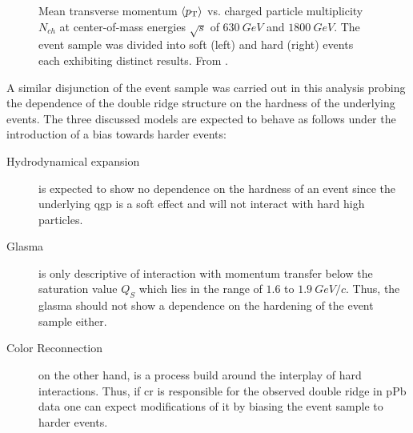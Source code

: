 \begin{figure}
\begin{subfigure}[b]{0.45\textwidth}
  \end{subfigure}
  \caption[Mean transverse momentum $\left< \pt \right>$ vs. charged particle multiplicity $N_{ch}$ at center-of-mass energies $\sqrt{s}$ of $\SI{630}{GeV}$ and $\SI{1800}{GeV}$.]{Mean transverse momentum $\left< \pt \right>$ vs. charged particle multiplicity $N_{ch}$ at center-of-mass energies $\sqrt{s}$ of $\SI{630}{GeV}$ and $\SI{1800}{GeV}$. The event sample was divided into soft (left) and hard (right) events each exhibiting distinct results. From \cite{Acosta2002}.}
    \label{fig:soft_hard_example}
\end{figure}

A similar disjunction of the event sample was carried out in this analysis probing the dependence of the double ridge structure on the hardness of the underlying events. The three discussed models are expected to behave as follows under the introduction of a bias towards harder events:
\begin{description}
\item [Hydrodynamical expansion] is expected to show no dependence on the hardness of an event since the underlying \gls{qgp} is a soft effect and will not interact with hard high \pt particles.
\item [Glasma] is only descriptive of interaction with momentum transfer below the saturation value $Q_S$ which lies in the range of $1.6$ to $\SI{1.9}{GeV/c}$. Thus, the glasma should not show a dependence on the hardening of the event sample either.
\item [Color Reconnection] on the other hand, is a process build around the interplay of hard interactions. Thus, if \gls{cr} is responsible for the observed double ridge in \gls{pPb} data one can expect modifications of it by biasing the event sample to harder events.
\end{description}

